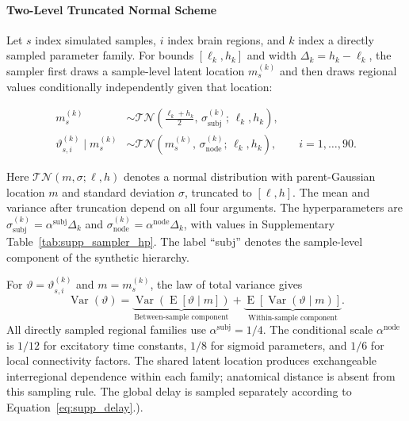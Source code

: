 \documentclass[11pt]{article}
\begin{document}
\paragraph{Two-Level Truncated Normal Scheme}
Let $s$ index simulated samples, $i$ index brain regions, and $k$ index a directly sampled parameter family. For bounds $[\ell_k,h_k]$ and width $\Delta_k=h_k-\ell_k$, the sampler first draws a sample-level latent location $m_s^{(k)}$ and then draws regional values conditionally independently given that location:

\begin{align}
m_s^{(k)} & \sim \mathcal{TN}\!\left(\frac{\ell_k+h_k}{2}, \, \sigma_{\mathrm{subj}}^{(k)}; \, \ell_k,h_k\right), \tag{S1.2}\label{eq:supp_sample_location}\\
\vartheta_{s,i}^{(k)} \mid m_s^{(k)} &\sim \mathcal{TN}\!\left(m_s^{(k)}, \, \sigma_{\mathrm{node}}^{(k)}; \, \ell_k,h_k\right), \qquad i=1,\ldots,90. \tag{S1.3}\label{eq:supp_regional_draw}
\end{align}


Here $\mathcal{TN}(m,\sigma;\ell,h)$ denotes a normal distribution with parent-Gaussian location $m$ and standard deviation $\sigma$, truncated to $[\ell,h]$. The mean and variance after truncation depend on all four arguments. The hyperparameters are $\sigma_{\mathrm{subj}}^{(k)}=\alpha^{\mathrm{subj}}\Delta_k$ and $\sigma_{\mathrm{node}}^{(k)}=\alpha^{\mathrm{node}}\Delta_k$, with values in Supplementary Table~\ref{tab:supp_sampler_hp}. The label ``subj'' denotes the sample-level component of the synthetic hierarchy.

For $\vartheta=\vartheta_{s,i}^{(k)}$ and $m=m_s^{(k)}$, the law of total variance gives
\begin{equation}
\operatorname{Var}(\vartheta)=
\underbrace{\operatorname{Var}\!\left(\operatorname{E}[\vartheta\mid m]\right)}_{\text{Between-sample component}}
+\underbrace{\operatorname{E}\!\left[\operatorname{Var}(\vartheta\mid m)\right]}_{\text{Within-sample component}}.
\tag{S1.4}\label{eq:supp_total_variance}
\end{equation}
All directly sampled regional families use $\alpha^{\mathrm{subj}}=1/4$. The conditional scale $\alpha^{\mathrm{node}}$ is $1/12$ for excitatory time constants, $1/8$ for sigmoid parameters, and $1/6$ for local connectivity factors. The shared latent location produces exchangeable interregional dependence within each family; anatomical distance is absent from this sampling rule. The global delay is sampled separately according to Equation~\eqref{eq:supp_delay}.).
\end{document}
